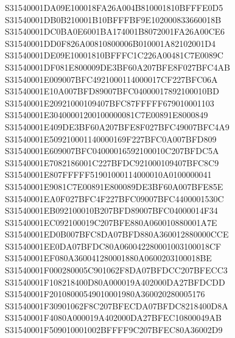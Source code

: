 \documentclass[12pt,a4paper]{article}
\begin{document}
\begin{framed}
{S31540001DA09E100018FA26A004B810001810BFFFE0D5\newline
S31540001DB0B210001B10BFFFBF9E102000833660018B\newline
S31540001DC0BA0E6001BA174001B8072001FA26A00CE6\newline
S31540001DD0F826A00810800006B010001A82102001D4\newline
S31540001DE09E10001810BFFFC1C226A00481C7E0089C\newline
S31540001DF081E800009DE3BF60A207BFE8F027BFC4AB\newline
S31540001E009007BFC4921000114000017CF227BFC06A\newline
S31540001E10A007BFD89007BFC04000017892100010BD\newline
S31540001E20921000109407BFC87FFFFF679010001103\newline
S31540001E30400001200100000081C7E00891E8000849\newline
S31540001E409DE3BF60A207BFE8F027BFC49007BFC4A9\newline
S31540001E509210001140000169F227BFC0A007BFD809\newline
S31540001E609007BFC04000016592100010C207BFDC5A\newline
S31540001E7082186001C227BFDC921000109407BFC8C9\newline
S31540001E807FFFFF51901000114000010A0100000041\newline
S31540001E9081C7E00891E800089DE3BF60A007BFE85E\newline
S31540001EA0F027BFC4F227BFC09007BFC4400001530C\newline
S31540001EB092100010B207BFD89007BFC04000014F34\newline
S31540001EC092100019C207BFE880A060010880001A7E\newline
S31540001ED0B007BFC8DA07BFD880A360012880000CCE\newline
S31540001EE0DA07BFDC80A060042280001003100018CF\newline
S31540001EF080A360041280001880A0600203100018BE\newline
S31540001F000280005C901062F8DA07BFDCC207BFECC3\newline
S31540001F108218400D80A000019A402000DA27BFDCDD\newline
S31540001F20108000549010001980A360020280005176\newline
S31540001F30901062F8C207BFECDA07BFDC8218400D8A\newline
S31540001F4080A000019A402000DA27BFEC10800049AB\newline
S31540001F509010001002BFFFF9C207BFEC80A36002D9\newline
}
\end{framed}
\end{document}
